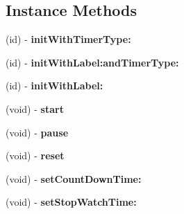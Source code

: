 \subsection*{Instance Methods}
\begin{DoxyCompactItemize}
\item 
\mbox{\label{interface_m_z_timer_label_a94eb8423bb104d46f5cc0fbf73cf2713}} 
(id) -\/ {\bfseries init\+With\+Timer\+Type\+:}
\item 
\mbox{\label{interface_m_z_timer_label_af93c61d54950b5dea3cbff18271ba957}} 
(id) -\/ {\bfseries init\+With\+Label\+:and\+Timer\+Type\+:}
\item 
\mbox{\label{interface_m_z_timer_label_ac09f15a7a1f8a015e14c7c9e062fccd6}} 
(id) -\/ {\bfseries init\+With\+Label\+:}
\item 
\mbox{\label{interface_m_z_timer_label_a3148012612c3a707de7a5cd74d8ef201}} 
(void) -\/ {\bfseries start}
\item 
\mbox{\label{interface_m_z_timer_label_a28b6618e12ef0adc66d94522c6da7d62}} 
(void) -\/ {\bfseries pause}
\item 
\mbox{\label{interface_m_z_timer_label_a4a8a73c7fd496be9364feaa511400bcc}} 
(void) -\/ {\bfseries reset}
\item 
\mbox{\label{interface_m_z_timer_label_aea4d7a90a832d71bc292e8bd9496d612}} 
(void) -\/ {\bfseries set\+Count\+Down\+Time\+:}
\item 
\mbox{\label{interface_m_z_timer_label_ae91e1c2a979ae0a3a1c928b8ee0aa1e3}} 
(void) -\/ {\bfseries set\+Stop\+Watch\+Time\+:}
\end{DoxyCompactItemize}
